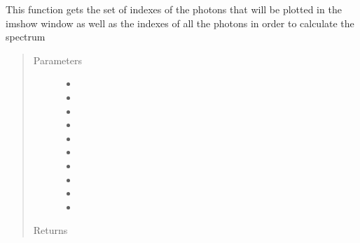 \documentclass[letterpaper,10pt,english]{sphinxmanual}
\begin{document}
\begin{fulllineitems}
\label{\detokenize{mcrat_movie:mcrat_movie.get_indexes_data}}
This function gets the set of indexes of the photons that will be plotted in the imshow window as well as the
indexes of all the photons in order to calculate the spectrum
\begin{quote}\begin{description}
\item[{Parameters}] \leavevmode\begin{itemize}
\item {} 
 \textendash{} 

\item {} 
 \textendash{} 

\item {} 
 \textendash{} 

\item {} 
 \textendash{} 

\item {} 
 \textendash{} 

\item {} 
 \textendash{} 

\item {} 
 \textendash{} 

\item {} 
 \textendash{} 

\item {} 
 \textendash{} 

\item {} 
 \textendash{} 

\end{itemize}

\item[{Returns}] \leavevmode


\end{description}\end{quote}

\end{fulllineitems}
\end{document}
